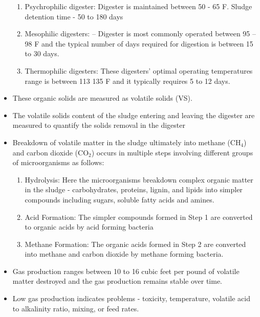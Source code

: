 \begin{itemize}
			\begin{enumerate}[1. ]
			\item Psychrophilic digester:  Digester is maintained between 50  - 65 F.  Sludge detention time - 50 to 180 days
			\item Mesophilic digesters: – Digester is most commonly operated  between 95 – 98 F and the typical number of days required for digestion is between 15 to 30 days.\\
			\item Thermophilic digesters:  These digesters’ optimal operating temperatures range is between 113   135 F and it typically requires 5 to 12 days.\\
			\end{enumerate}     
		\item These organic solids are measured as volatile solids (VS).  
		\item The volatile solids content of the sludge entering and leaving the digester are measured to quantify the solids removal in the digester
		 \item Breakdown of volatile matter in the sludge ultimately into methane (CH$_4$) and carbon dioxide (CO$_2$) occurs in multiple steps involving different groups of microorganisms as follows:\\
			\begin{enumerate}[Step 1.]
			\item Hydrolysis:  Here the microorganisms breakdown complex organic matter in the sludge - carbohydrates, proteins, lignin, and lipids into simpler compounds including sugars, soluble fatty acids and amines.\\
			\item Acid Formation:  The simpler compounds formed in Step 1 are converted to organic acids by acid forming bacteria\\
			\item Methane Formation: The organic acids formed in Step 2 are converted into methane and carbon dioxide by methane forming bacteria.\\
			\end{enumerate}
		\item Gas production ranges between 10 to 16 cubic feet per pound of volatile matter destroyed and the gas production remains stable over time.
		\item Low gas production indicates problems - toxicity, temperature, volatile acid to alkalinity ratio, mixing, or feed rates.
		\end{itemize}

